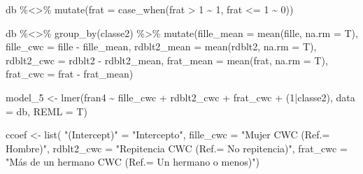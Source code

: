 \documentclass[
  12pt,
  a4paper,
]{article}
\newenvironment{Shaded}{\begin{snugshade}}{\end{snugshade}}
\newcommand{\AttributeTok}[1]{\textcolor[rgb]{0.77,0.63,0.00}{#1}}
\newcommand{\DecValTok}[1]{\textcolor[rgb]{0.00,0.00,0.81}{#1}}
\newcommand{\FunctionTok}[1]{\textcolor[rgb]{0.00,0.00,0.00}{#1}}
\newcommand{\NormalTok}[1]{#1}
\newcommand{\OtherTok}[1]{\textcolor[rgb]{0.56,0.35,0.01}{#1}}
\newcommand{\SpecialCharTok}[1]{\textcolor[rgb]{0.00,0.00,0.00}{#1}}
\newcommand{\StringTok}[1]{\textcolor[rgb]{0.31,0.60,0.02}{#1}}
\begin{document}
\begin{Shaded}
\begin{Highlighting}[]
\NormalTok{db }\SpecialCharTok{\%\textless{}\textgreater{}\%}
  \FunctionTok{mutate}\NormalTok{(}\AttributeTok{frat =} \FunctionTok{case\_when}\NormalTok{(frat }\SpecialCharTok{\textgreater{}} \DecValTok{1} \SpecialCharTok{\textasciitilde{}} \DecValTok{1}\NormalTok{,}
\NormalTok{                          frat }\SpecialCharTok{\textless{}=} \DecValTok{1} \SpecialCharTok{\textasciitilde{}} \DecValTok{0}\NormalTok{))}

\NormalTok{db }\SpecialCharTok{\%\textless{}\textgreater{}\%} 
  \FunctionTok{group\_by}\NormalTok{(classe2) }\SpecialCharTok{\%\textgreater{}\%} 
  \FunctionTok{mutate}\NormalTok{(}\AttributeTok{fille\_mean =} \FunctionTok{mean}\NormalTok{(fille, }\AttributeTok{na.rm =}\NormalTok{ T),}
         \AttributeTok{fille\_cwc =}\NormalTok{ fille }\SpecialCharTok{{-}}\NormalTok{ fille\_mean,}
         \AttributeTok{rdblt2\_mean =} \FunctionTok{mean}\NormalTok{(rdblt2, }\AttributeTok{na.rm =}\NormalTok{ T),}
         \AttributeTok{rdblt2\_cwc =}\NormalTok{ rdblt2 }\SpecialCharTok{{-}}\NormalTok{ rdblt2\_mean,}
         \AttributeTok{frat\_mean =} \FunctionTok{mean}\NormalTok{(frat, }\AttributeTok{na.rm =}\NormalTok{ T),}
         \AttributeTok{frat\_cwc =}\NormalTok{ frat }\SpecialCharTok{{-}}\NormalTok{ frat\_mean)}

\NormalTok{model\_5 }\OtherTok{\textless{}{-}} \FunctionTok{lmer}\NormalTok{(fran4 }\SpecialCharTok{\textasciitilde{}}\NormalTok{ fille\_cwc }\SpecialCharTok{+}\NormalTok{ rdblt2\_cwc }\SpecialCharTok{+}\NormalTok{ frat\_cwc }\SpecialCharTok{+}\NormalTok{ (}\DecValTok{1}\SpecialCharTok{|}\NormalTok{classe2), }
                \AttributeTok{data =}\NormalTok{ db,}
                \AttributeTok{REML =}\NormalTok{ T)}

\NormalTok{ccoef }\OtherTok{\textless{}{-}} \FunctionTok{list}\NormalTok{(}
  \StringTok{"(Intercept)"} \OtherTok{=} \StringTok{"Intercepto"}\NormalTok{,}
  \AttributeTok{fille\_cwc =} \StringTok{"Mujer CWC (Ref.= Hombre)"}\NormalTok{,}
  \AttributeTok{rdblt2\_cwc =} \StringTok{"Repitencia CWC (Ref.= No repitencia)"}\NormalTok{,}
  \AttributeTok{frat\_cwc =} \StringTok{"Más de un hermano CWC (Ref.= Un hermano o menos)"}\NormalTok{)}



\end{Highlighting}
\end{Shaded}
\end{document}
